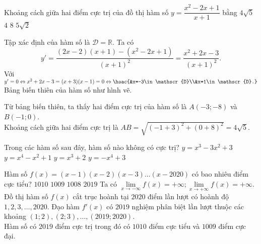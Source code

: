 \begin{ex}%
 Khoảng cách giữa hai điểm cực trị của đồ thị hàm số $y=\dfrac{x^2-2x+1}{x+1}$ bằng
 \choice
 {\True $4\sqrt{5}$}
 {$4$}
 {$8$}
 {$5\sqrt{2}$}
 \loigiai
 {
 Tập xác định của hàm số là $\mathscr{D}=\mathbb{R}$. Ta có
 \[y'=\dfrac{(2x-2)(x+1)-(x^2-2x+1)}{(x+1)^2}=\dfrac{x^2+2x-3}{(x+1)^2}.\]
 Với $y'=0\Leftrightarrow x^2+2x-3=(x+3)(x-1)=0\Leftrightarrow\hoac{&x=-3\in\mathscr{D}\\&x=1\in\mathscr{D}.}$\\
 Bảng biến thiên của hàm số như hình vẽ.
 \begin{center}
 \end{center}
 Từ bảng biến thiên, ta thấy hai điểm cực trị của hàm số là $A(-3;-8)$ và $B(-1;0)$.\\
 Khoảng cách giữa hai điểm cực trị là $AB=\sqrt{(-1+3)^2+(0+8)^2}=4\sqrt{5}$.
 }
\end{ex}
\begin{ex}%
 Trong các hàm số sau đây, hàm số nào không có cực trị?
 \choice
 {$y=x^3-3x^2+3$}
 {$y=x^4-x^2+1$}
 {\True $y=x^3+2$}
 {$y=-x^4+3$}
\end{ex}
\begin{ex}%
 Hàm số $f(x)=(x-1)(x-2)(x-3)\ldots(x-2020)$ có bao nhiêu điểm cực tiểu?
 \choice
 {\True $1010$}
 {$1009$}
 {$1008$}
 {$2019$}
 \loigiai
 {
 Ta có $\lim\limits_{x\to-\infty}f(x)=+\infty ;\lim\limits_{x\to+\infty}f(x)=+\infty$. Đồ thị hàm số $f(x)$ cắt trục hoành tại $2020$ điểm lần lượt có hoành độ $1,2,3,\ldots,2020$. Đạo hàm $f'(x)$ có $2019$ nghiệm phân biệt lần lượt thuộc các khoảng $(1 ; 2),(2 ; 3),\ldots,(2019 ; 2020)$.\\
 Hàm số có $2019$ điểm cực trị trong đó có $1010$ điểm cực tiểu và $1009$ điểm cực đại.
 }
\end{ex}
